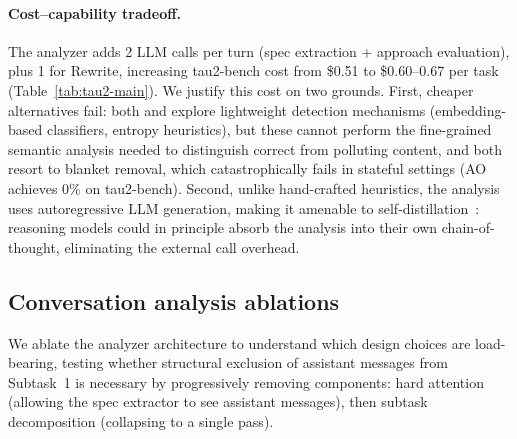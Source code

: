 \documentclass{article}
\begin{document}
\paragraph{Cost--capability tradeoff.} The analyzer adds 2 LLM calls per turn (spec extraction + approach evaluation), plus 1 for Rewrite, increasing tau2-bench cost from \$0.51 to \$0.60--0.67 per task (Table~\ref{tab:tau2-main}). We justify this cost on two grounds. First, cheaper alternatives fail: both \citet{huang2026context} and \citet{khalid2025ergo} explore lightweight detection mechanisms (embedding-based classifiers, entropy heuristics), but these cannot perform the fine-grained semantic analysis needed to distinguish correct from polluting content, and both resort to blanket removal, which catastrophically fails in stateful settings (AO achieves 0\% on tau2-bench). Second, unlike hand-crafted heuristics, the analysis uses autoregressive LLM generation, making it amenable to self-distillation~\citep{zhao2026selfdistillreason,hubotter2026rlselfdistill,shenfeld2026selfdistill}: reasoning models could in principle absorb the analysis into their own chain-of-thought, eliminating the external call overhead.


\subsection{Conversation analysis ablations}
\label{sec:analysis-ablations}

We ablate the analyzer architecture to understand which design choices are load-bearing, testing whether structural exclusion of assistant messages from Subtask~1 is necessary by progressively removing components: hard attention (allowing the spec extractor to see assistant messages), then subtask decomposition (collapsing to a single pass).
\label{sec:cognitive-hazard}
\end{document}

